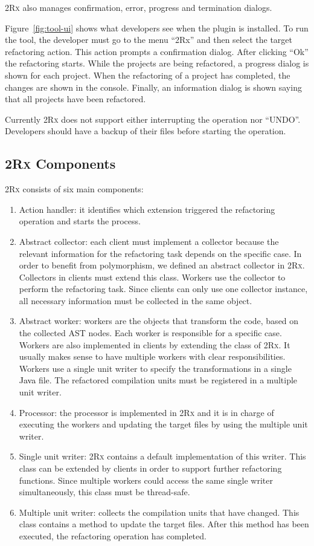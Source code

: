 \documentclass[type=bsc,accentcolor=tud9c]{tudthesis}
\newcommand{\framework}[1]{\textcolor{black}{#1}}
\newcommand{\toolcore}{\textsc{2Rx}}
\begin{document}
\toolcore{} also manages confirmation, error, progress and termination dialogs.

Figure~\ref{fig:tool-ui} shows what developers see when the plugin is installed. To run the tool, the developer must go to the menu ``2Rx'' and then select the target refactoring action. This action prompts a confirmation dialog. After clicking ``Ok'' the refactoring starts. While the projects are being refactored, a progress dialog is shown for each project. When the refactoring of a project has completed, the changes are shown in the console. Finally, an information dialog is shown saying that all projects have been refactored.

Currently \toolcore{} does not support either interrupting the operation nor ``UNDO''. Developers should have a backup of their files before starting the operation.

\subsection{\toolcore{} Components}
\label{sec:core-components}
\toolcore{} consists of six main components:
\begin{enumerate}
	\item Action handler: it identifies which extension triggered the refactoring operation and starts the process.
	\item Abstract collector: each client must implement a collector because the relevant information for the refactoring task depends on the specific case. In order to benefit from polymorphism, we defined an abstract collector in \toolcore{}. Collectors in clients must extend this class. Workers use the collector to perform the refactoring task. Since clients can only use one collector instance, all necessary information must be collected in the same object.
	\item Abstract worker: workers are the objects that transform the code, based on the collected AST nodes. Each worker is responsible for a specific case. Workers are also implemented in clients by extending the class  of \toolcore{}. It usually makes sense to have multiple workers with clear responsibilities. Workers use a single unit writer to specify the transformations in a single \framework{Java} file. The refactored compilation units must be registered in a multiple unit writer.
	\item Processor: the processor is implemented in \toolcore{} and it is in charge of executing the workers and updating the target files by using the multiple unit writer.
	\item Single unit writer: \toolcore{} contains a default implementation of this writer. This class can be extended by clients in order to support further refactoring functions. Since multiple workers could access the same single writer simultaneously, this class must be thread-safe.
	\item Multiple unit writer: collects the compilation units that have changed. This class contains a method to update the target files. After this method has been executed, the refactoring operation has completed.
\end{enumerate}
\end{document}

